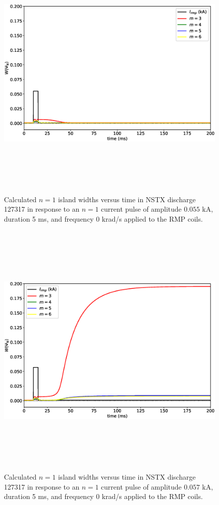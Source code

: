 \documentclass[12pt,prb,aps]{revtex4-1}
\begin{document}
\begin{figure}
\centerline{\includegraphics[height=5in]{Fig5.eps}}
\caption{Calculated $n=1$ island widths  versus time in NSTX discharge 127317 in response to an $n=1$ current pulse of amplitude $0.055$ kA, duration 5 ms, and frequency 0 krad/s applied to the RMP coils.}\label{fig5}
\end{figure}

\begin{figure}
\centerline{\includegraphics[height=5in]{Fig6.eps}}
\caption{Calculated $n=1$ island widths versus time in NSTX discharge 127317 in response to an $n=1$ current pulse of amplitude $0.057$ kA, duration 5 ms, and frequency 0 krad/s applied to the RMP coils.}\label{fig6}
\end{figure}
\end{document}
